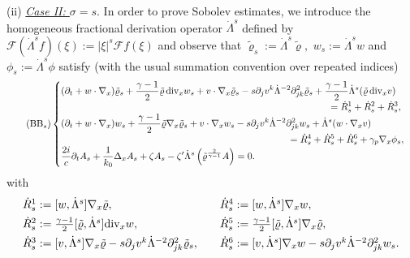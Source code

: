 \documentclass[11pt,twoside]{amsart}
\newcommand{\Div}{{\rm div}_x}
\newcommand{\tildrho}{\tilde{\varrho}}
\newcommand{\ds}{\displaystyle}
\renewcommand{\div}{\mbox{\rm div}\;\!}
\def\cF{{\mathcal F}}
\begin{document}
  \medbreak
  
(ii) \underline{\em Case II:  $\sigma=s$}. In order to prove Sobolev estimates, we introduce  the homogeneous fractional derivation operator 
 $\dot\Lambda^s$  defined by  $\cF(\dot\Lambda^sf)(\xi):=|\xi|^s\cF f(\xi)$ and observe that  
 $\tildrho_s:=\dot\Lambda^s\tildrho,$ $w_s:=\dot\Lambda^sw$ and $\phi_s:=\dot\Lambda^s\phi$ satisfy
(with the usual summation convention over repeated indices)
\begin{align}\tag{BB$_s$}  
\begin{cases} 
\ds (\partial_t  + w \cdot \nabla_x)\tildrho_s + \frac{\gamma-1}{2} \tildrho \, \Div w_s + v \cdot \nabla_x \tildrho_s - s \partial_j v^k \dot \Lambda^{-2}\partial^2_{jk}\tildrho_s
+ \frac{\gamma-1}2 \dot \Lambda^s(\tildrho \, \Div v) \\ 
\hspace{10cm} \ds =\dot R^1_s + \dot R^2_s + \dot R^3_s,\\
\ds (\partial_t + w \cdot\nabla_x)w_s+\frac{\gamma-1}2\tildrho\nabla_x\tildrho_s+v\cdot\nabla_x w_s -s\partial_j v^k \dot \Lambda^{-2}\partial^2_{jk} w_s + \dot \Lambda^s(w\cdot\nabla_x v) \\
\hspace{8.5cm} \ds =\dot R^4_s+\dot R^5_s+\dot R^6_s+\gamma_p\nabla_x\phi_s,\\
\ds \frac{2i}{c}\partial_t A_s+\frac{1}{k_0}\Delta_x A_s
+\zeta A_s-\zeta' \dot\Lambda^s\left(\tildrho^{\frac{2}{\gamma-1}}A\right)=0.
\end{cases}\label{eq:BB_s}
\end{align}
with 
$$\begin{array}{ll}
\dot R^1_s : =[w,\dot\Lambda^s]\nabla_x\tildrho,\quad & \dot R^4_s:=[w,\dot\Lambda^s]\nabla_x w, \\ [1ex]
\dot R^2_s:= \frac{\gamma-1}2[\tildrho,\dot\Lambda^s]\Div w,\quad&\dot R^5_s:=\frac{\gamma-1}2[\tildrho,\dot\Lambda^s]\nabla_x\tildrho,\\[1ex]
\dot R^3_s:=[v,\dot\Lambda^s]\nabla_x\tildrho-s\partial_j v^k\dot\Lambda^{-2}\partial^2_{jk}\tildrho_s,\quad&
\dot R^6_s:=[v,\dot\Lambda^s]\nabla_x w-s\partial_jv^k\dot\Lambda^{-2}\partial^2_{jk} w_s. 
\end{array}
$$
\end{document}
